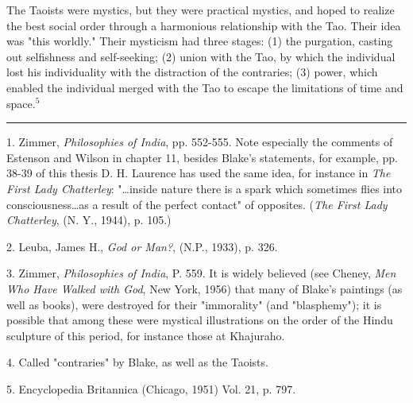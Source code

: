 \begin{center}
	\parbox{0.8\textwidth}{
		\hspace*{5mm}The Taoists were mystics, but they were practical
		mystics, and hoped to realize the best social order through
		a harmonious relationship with the Tao. Their idea was
		"this worldly." Their mysticism had three stages: (1) the
		purgation, casting out selfishness and self-seeking; (2)
		union with the Tao, by which the individual lost his individuality
		with the distraction of the contraries; (3) power,
		which enabled the individual merged with the Tao to escape
		the limitations of time and space.$^{5}$\par
	}%
\end{center}
\vspace*{\fill}
\noindent\rule{0.25\textwidth}{0.4pt}\par
1. Zimmer, \textit{Philosophies of India}, pp. 552-555. Note
especially the comments of Estenson and Wilson in chapter 11,
besides Blake's statements, for example, pp. 38-39 of this thesis
D. H. Laurence has used the same idea, for instance in \textit{The}
\textit{First Lady Chatterley}: "\dots inside nature there is a spark
which sometimes flies into consciousness\dots as a result of the
perfect contact" of opposites. (\textit{The First Lady Chatterley},
(N. Y., 1944), p. 105.)\par
2. Leuba, James H., \textit{God or Man?}, (N.P., 1933), p. 326.\par
3. Zimmer, \textit{Philosophies of India}, P. 559. It is widely believed
(see Cheney, \textit{Men Who Have Walked with God}, New York,
1956) that many of Blake's paintings (as well as books), were
destroyed for their "immorality" (and "blasphemy"); it is
possible that among these were mystical illustrations on the
order of the Hindu sculpture of this period, for instance
those at Khajuraho.\par
4. Called "contraries" by Blake, as well as the Taoists.\par
5. Encyclopedia Britannica (Chicago, 1951) Vol. 21, p. 797.\par

\newpage


{}


